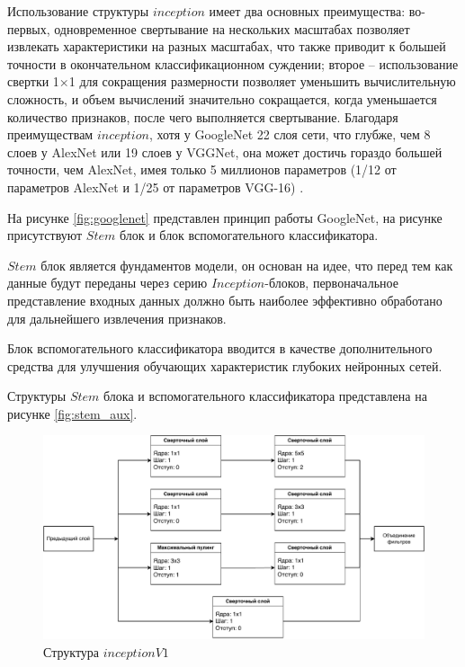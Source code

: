 Использование структуры $inception$ имеет два основных преимущества: во-первых, одновременное свертывание на нескольких масштабах позволяет извлекать характеристики на разных масштабах, что также приводит к большей точности в окончательном классификационном суждении; второе – использование свертки 1×1 для сокращения размерности позволяет уменьшить вычислительную сложность, и объем вычислений значительно сокращается, когда уменьшается количество признаков, после чего выполняется свертывание. Благодаря преимуществам $inception$, хотя у GoogleNet 22 слоя сети, что глубже, чем 8 слоев у AlexNet или 19 слоев у VGGNet, она может достичь гораздо большей точности, чем AlexNet, имея только 5 миллионов параметров (1/12 от параметров AlexNet и 1/25 от параметров VGG-16) \cite{googlenet}.

На рисунке \ref{fig:googlenet} представлен принцип работы GoogleNet, на рисунке присутствуют $Stem$ блок и блок вспомогательного классификатора.

$Stem$ блок является фундаментов модели, он основан на идее, что перед тем как данные будут переданы через серию  $Inception$-блоков, первоначальное представление входных данных должно быть наиболее эффективно обработано для дальнейшего извлечения признаков. 

Блок вспомогательного классификатора вводится в качестве дополнительного средства для улучшения обучающих характеристик глубоких нейронных сетей.

Структуры $Stem$ блока и вспомогательного классификатора представлена на рисунке \ref{fig:stem_aux}.

\begin{figure}[H]
	\centering
	\includegraphics[width=\textwidth]{img/inception.pdf}
	\caption{Структура $inceptionV1$}
	\label{fig:inception}
\end{figure}

